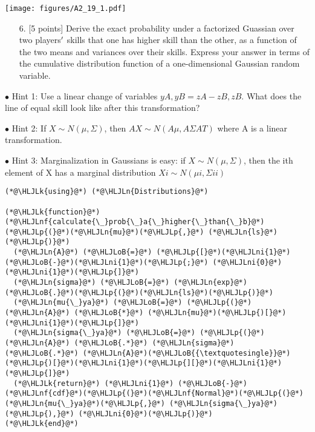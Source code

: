 \documentclass[12pt,a4paper]{article}
\newcommand{\HLJLk}[1]{\textcolor[RGB]{148,91,176}{\textbf{#1}}}
\newcommand{\HLJLn}[1]{#1}
\newcommand{\HLJLnf}[1]{\textcolor[RGB]{66,102,213}{#1}}
\newcommand{\HLJLni}[1]{\textcolor[RGB]{59,151,46}{#1}}
\newcommand{\HLJLoB}[1]{\textcolor[RGB]{102,102,102}{\textbf{#1}}}
\newcommand{\HLJLp}[1]{#1}
\begin{document}
\texttt{[image: figures/A2\_19\_1.pdf]}

\begin{itemize}
\item[6. ] [5 points] Derive the exact probability under a factorized Guassian over two players\ensuremath{\rq} skills that one has higher skill than the other, as a function of the two means and variances over their skills. Express your answer in terms of the cumulative distribution function of a one-dimensional Gaussian random variable.

\end{itemize}
\ensuremath{\bullet} Hint 1: Use a linear change of variables $yA,yB = zA - zB,zB$. What does the line of equal skill look like after this transformation?

\ensuremath{\bullet} Hint 2: If $X \ensuremath{\sim} N (\ensuremath{\mu}, \ensuremath{\Sigma})$, then $AX \ensuremath{\sim} N (A\ensuremath{\mu}, A\ensuremath{\Sigma}AT )$ where A is a linear transformation.

\ensuremath{\bullet} Hint 3: Marginalization in Gaussians is easy: if $X \ensuremath{\sim} N (\ensuremath{\mu}, \ensuremath{\Sigma})$, then the ith element of X has a marginal distribution $Xi \ensuremath{\sim} N(\ensuremath{\mu}i,\ensuremath{\Sigma}ii)$


\begin{lstlisting}
(*@\HLJLk{using}@*) (*@\HLJLn{Distributions}@*)

(*@\HLJLk{function}@*) (*@\HLJLnf{calculate{\_}prob{\_}a{\_}higher{\_}than{\_}b}@*)(*@\HLJLp{(}@*)(*@\HLJLn{mu}@*)(*@\HLJLp{,}@*) (*@\HLJLn{ls}@*)(*@\HLJLp{)}@*)
  (*@\HLJLn{A}@*) (*@\HLJLoB{=}@*) (*@\HLJLp{[}@*)(*@\HLJLni{1}@*) (*@\HLJLoB{-}@*)(*@\HLJLni{1}@*)(*@\HLJLp{;}@*) (*@\HLJLni{0}@*) (*@\HLJLni{1}@*)(*@\HLJLp{]}@*)
  (*@\HLJLn{sigma}@*) (*@\HLJLoB{=}@*) (*@\HLJLn{exp}@*)(*@\HLJLoB{.}@*)(*@\HLJLp{(}@*)(*@\HLJLn{ls}@*)(*@\HLJLp{)}@*)
  (*@\HLJLn{mu{\_}ya}@*) (*@\HLJLoB{=}@*) (*@\HLJLp{(}@*)(*@\HLJLn{A}@*) (*@\HLJLoB{*}@*) (*@\HLJLn{mu}@*)(*@\HLJLp{)[}@*)(*@\HLJLni{1}@*)(*@\HLJLp{]}@*)
  (*@\HLJLn{sigma{\_}ya}@*) (*@\HLJLoB{=}@*) (*@\HLJLp{(}@*)(*@\HLJLn{A}@*) (*@\HLJLoB{.*}@*) (*@\HLJLn{sigma}@*) (*@\HLJLoB{.*}@*) (*@\HLJLn{A}@*)(*@\HLJLoB{{\textquotesingle}}@*)(*@\HLJLp{)[}@*)(*@\HLJLni{1}@*)(*@\HLJLp{][}@*)(*@\HLJLni{1}@*)(*@\HLJLp{]}@*)
  (*@\HLJLk{return}@*) (*@\HLJLni{1}@*) (*@\HLJLoB{-}@*) (*@\HLJLnf{cdf}@*)(*@\HLJLp{(}@*)(*@\HLJLnf{Normal}@*)(*@\HLJLp{(}@*)(*@\HLJLn{mu{\_}ya}@*)(*@\HLJLp{,}@*) (*@\HLJLn{sigma{\_}ya}@*)(*@\HLJLp{),}@*) (*@\HLJLni{0}@*)(*@\HLJLp{)}@*)
(*@\HLJLk{end}@*)
\end{lstlisting}
\end{document}
